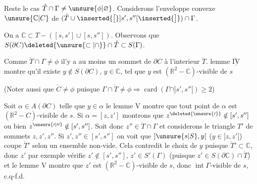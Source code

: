 \margin{!!}Reste le cas $\mathring{T}\cap\Gamma\ne\unsure{\phi|\varnothing}$. Considerons l'enveloppe convexe $\unsure{\mathbb{C}|C}$ de $(\mathring{T}\cup\inserted{\bigl[}]s',s''[\inserted{\bigr]})\cap\Gamma$.

On a $\mathbb{C}\subset T-([s,s']\cup[s,s''])$. Observons que $S(\partial C)\deleted{\unsure{\subset|\cap}}\cap\mathring{T}\subset S(\Gamma)$.

Comme $\mathring{T}\cap\Gamma\ne\phi$ il'y a au moins un sommet de $\partial C$ à l'interieur $\mathring{T}$.  lemme $\underline{\overline{\mathrm{IV}}}$ montre qu'il existe $y\notin S(\partial C)$, $y\in\mathbb{C}$, tel que $y$ est $(\mathbb{R}^2-\mathbb{C})$-visible de $s$

(Noter aussi que $\mathring{C}\ne\phi$ puisque $\Gamma\cap\mathring{T}\ne\phi\Rightarrow\operatorname{card}(\Gamma\cap]s',s''[)\geq 2$)

Soit $\alpha\in A(\partial C)$ telle que $y\in\alpha$ le lemme V montre que tout point de $\alpha$ est $(\mathbb{R}^2-C)$-visible de $s$. Si $\alpha=[z,z']$ montrons que $z^{\deleted{\unsure{\prime}}}\notin[s',s'']$ ou bien $z^{\unsure{\prime|\prime\prime}}\notin[s',s'']$. Soit donc $z''\in\mathring{T}\cap\Gamma$ et considerons le triangle $T'$ de sommets $z,z',z''$. Si $z',z''\in[s',s'']$ on voit que $]\unsure{s|S},y[$ ($y\in]z,z'[$) coupe $\mathring{T}'$ selon un ensemble non-vide. Cela contredit le choix de $y$ puisque $\mathring{T}'\subset\mathbb{C}$,  donc $z'$ par exemple vérifie $z'\notin[s',s'']$, $z'\in S'(\Gamma)$ (puisque $z'\in S(\partial\mathbb{C})\cap\mathring{T}$) et le lemme  V montre que $z'$ est $(\mathbb{R}^2-\mathbb{C})$-visible de $s$, donc $\operatorname{int}\Gamma$-visible de $s$, c.q-f.d.

